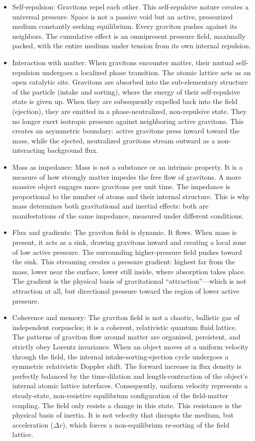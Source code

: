 \documentclass[11pt]{article}
\begin{document}
\begin{itemize}
\item
  Self-repulsion: Gravitons repel each other. This self-repulsive nature creates a universal pressure. Space is not a passive void but an active, pressurized medium constantly seeking equilibrium. Every graviton pushes against its neighbors. The cumulative effect is an omnipresent pressure field, maximally packed, with the entire medium under tension from its own internal repulsion.
\item
  Interaction with matter: When gravitons encounter matter, their mutual self-repulsion undergoes a localized phase transition. The atomic lattice acts as an open catalytic site. Gravitons are absorbed into the sub-elementary structure of the particle (intake and sorting), where the energy of their self-repulsive state is given up. When they are subsequently expelled back into the field (ejection), they are emitted in a phase-neutralized, non-repulsive state. They no longer exert isotropic pressure against neighboring active gravitons. This creates an asymmetric boundary: active gravitons press inward toward the mass, while the ejected, neutralized gravitons stream outward as a non-interacting background flux.
\item
  Mass as impedance: Mass is not a substance or an intrinsic property. It is a measure of how strongly matter impedes the free flow of gravitons. A more massive object engages more gravitons per unit time. The impedance is proportional to the number of atoms and their internal structure. This is why mass determines both gravitational and inertial effects: both are manifestations of the same impedance, measured under different conditions.
\item
  Flux and gradients: The graviton field is dynamic. It flows. When mass is present, it acts as a sink, drawing gravitons inward and creating a local zone of low active pressure. The surrounding higher-pressure field pushes toward the sink. This streaming creates a pressure gradient: highest far from the mass, lower near the surface, lower still inside, where absorption takes place. The gradient is the physical basis of gravitational ``attraction''---which is not attraction at all, but directional pressure toward the region of lower active pressure.
\item
  Coherence and memory: The graviton field is not a chaotic, ballistic gas of independent corpuscles; it is a coherent, relativistic quantum fluid lattice. The patterns of graviton flow around matter are organized, persistent, and strictly obey Lorentz invariance. When an object moves at a uniform velocity through the field, the internal intake-sorting-ejection cycle undergoes a symmetric relativistic Doppler shift. The forward increase in flux density is perfectly balanced by the time-dilation and length-contraction of the object's internal atomic lattice interfaces. Consequently, uniform velocity represents a steady-state, non-resistive equilibrium configuration of the field-matter coupling. The field only resists a change in this state. This resistance is the physical basis of inertia. It is not velocity that disrupts the medium, but acceleration (\(\Delta v\)), which forces a non-equilibrium re-sorting of the field lattice.

\end{itemize}
\end{document}
